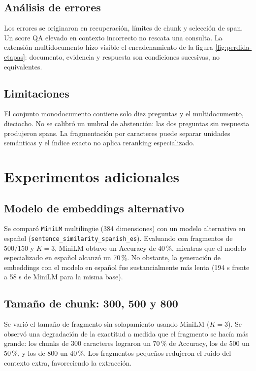 \documentclass[12pt,letterpaper]{article}
\begin{document}
\subsection{Análisis de errores}

Los errores se originaron en recuperación, límites de chunk y selección de
span. Un score QA elevado en contexto incorrecto no rescata una consulta. La
extensión multidocumento hizo visible el encadenamiento de la figura
\ref{fig:perdida-etapas}: documento, evidencia y respuesta son condiciones
sucesivas, no equivalentes.

\subsection{Limitaciones}

El conjunto monodocumento contiene solo diez preguntas y el multidocumento,
dieciocho. No se calibró un umbral de abstención: las dos preguntas sin
respuesta produjeron spans. La fragmentación por caracteres puede separar
unidades semánticas y el índice exacto no aplica reranking especializado.

\section{Experimentos adicionales}

\subsection{Modelo de embeddings alternativo}

Se comparó \texttt{MiniLM} multilingüe (384 dimensiones) con un modelo alternativo en español (\texttt{sentence\_similarity\_spanish\_es}). Evaluando con fragmentos de 500/150 y $K=3$, MiniLM obtuvo un Accuracy de 40\,\%, mientras que el modelo especializado en español alcanzó un 70\,\%. No obstante, la generación de embeddings con el modelo en español fue sustancialmente más lenta (194 s frente a 58 s de MiniLM para la misma base).

\subsection{Tamaño de chunk: 300, 500 y 800}

Se varió el tamaño de fragmento sin solapamiento usando MiniLM ($K=3$). Se observó una degradación de la exactitud a medida que el fragmento se hacía más grande: los chunks de 300 caracteres lograron un 70\,\% de Accuracy, los de 500 un 50\,\%, y los de 800 un 40\,\%. Los fragmentos pequeños redujeron el ruido del contexto extra, favoreciendo la extracción.
\end{document}
